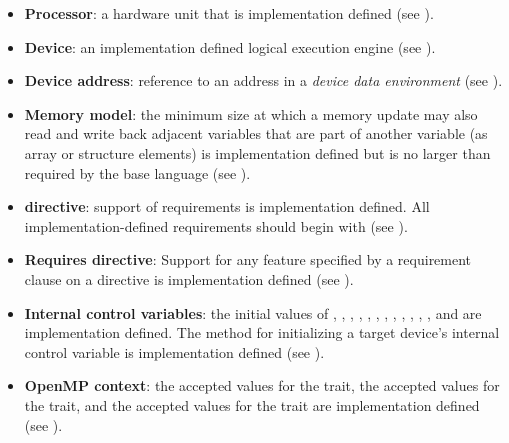\begin{itemize}
\item \textbf{Processor}: a hardware unit that is implementation defined (see
).

\item \textbf{Device}: an implementation defined logical execution engine (see
).

\item \textbf{Device address}: reference to an address in a \emph{device data environment} (see ).

\item \textbf{Memory model}: the minimum size at which a memory update may also read and
write back adjacent variables that are part of another variable (as array or structure
elements) is implementation defined but is no larger than required by the base
language (see ).

\item {} \textbf{directive}: support of requirements is implementation defined. All implementation-defined requirements should begin with  (see ).

\item \textbf{Requires directive}: Support for any feature specified by a
requirement clause on a  directive is implementation
defined (see ).

\item \textbf{Internal control variables}: the initial values of
, , , ,
, , ,
, ,
, , ,
 and  are implementation defined.  The method for
initializing a target device's internal control variable is
implementation defined (see ).

\item \textbf{OpenMP context}: the accepted  values for
  the  trait, the accepted  values for the
   trait, and the accepted  values for
  the  trait are implementation defined (see
  ).


\end{itemize}
